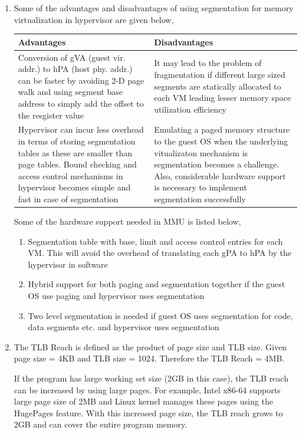 \documentclass[11pt,a4paper,oneside]{article}
\begin{document}
\begin{enumerate}
		\item Some of the advantages and disadvantages of using segmentation for memory virtualization in hypervisor are given below,
		\begin{center}
			\begin{tabular}{|p{6.5cm}|p{6.5cm}|}
				\hline 
				\textbf{Advantages}  & \textbf{Disadvantages} \\
				\hline
				Conversion of gVA (guest vir. addr.) to hPA (host phy. addr.) can be faster by avoiding 2-D page walk and using segment base address to simply add the offset to the resgister value & It may lead to the problem of fragmentation if different large sized segments are statically allocated to each VM leading lesser memory space utilization efficiency\\
				\hline
				Hypervisor can incur less overhead in terms of storing segmentation tables as these are smaller than page tables. Bound checking and access control mechanisms in hypervisor becomes simple and fast in case of segmentation &  Emulating a paged memory structure to the guest OS when the underlying vitualizaton mechanism is segmentation becomes a challenge. Also, considerable hardware support is necessary to implement segmentation successfully\\
				\hline
				\end{tabular}
		\end{center}
	    Some of the hardware support needed in MMU is listed below,
	    \begin{enumerate}
	    	\item Segmentation table with base, limit and access control entries for each VM. This will avoid the overhead of translating each gPA to hPA by the hypervisor in software
	    	\item Hybrid support for both paging and segmentation together if the guest OS use paging and hypervisor uses segmentation
	    	\item Two level segmentation is needed if guest OS uses segmentation for code, data segments etc. and hypervisor uses segmentation
	    \end{enumerate}
		
		\item The TLB Reach is defined as the product of page size and TLB size. Given page size = 4KB and TLB size = 1024. Therefore the TLB Reach = 4MB.
		
		If the program has large working set size (2GB in this case), the TLB reach can be increased by using large pages. For example, Intel x86-64 supports large page size of 2MB and Linux kernel manages these pages using the HugePages feature. With this increased page size, the TLB reach grows to 2GB and can cover the entire program memory. 
		

\end{enumerate}
\end{document}
